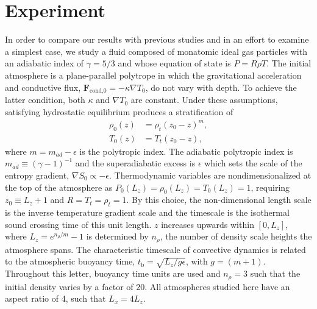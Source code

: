 \documentclass[aps, prl, twocolumn, nofootinbib, groupedaddress, amsfonts, amssymb, amsmath]{revtex4-1}
\newcommand{\grad}{\ensuremath{\nabla}}
\begin{document}
\section{Experiment} 
\label{sec:experiment}
In order to compare our results with previous studies and in an effort to examine a simplest case,
we study a fluid composed of monatomic ideal gas particles with an adiabatic index of $\gamma = 5/3$ and
whose equation of state is $P = R\rho T$. 
The initial atmosphere is a plane-parallel polytrope in which the gravitational acceleration
and conductive flux, $\bm{F}_{\text{cond,0}} = -\kappa \grad T_0$, do not vary with depth. To
achieve the latter condition, both $\kappa$ and $\grad T_0$ are constant.
Under these assumptions, satisfying hydrostatic equilibrium produces a stratification of
\begin{equation}
\begin{split}
\rho_0(z) &= \rho_{t}(z_0 - z)^m, \\
T_0(z)    &= T_{t}(z_0 - z),
\label{eqn:polytrope}
\end{split}
\end{equation}
where $m = m_{ad} - \epsilon$ is the polytropic index.
The adiabatic polytropic index is $m_{ad} \equiv (\gamma-1)^{-1}$ and
the superadiabatic excess is $\epsilon$ which sets the scale 
of the entropy gradient, $\grad S_0 \propto -\epsilon$.
Thermodynamic variables are nondimensionalized at the top of the atmosphere as 
$P_0(L_z) = \rho_0(L_z) = T_0(L_z) = 1$, requiring $z_0 \equiv L_z + 1$ and $R = T_{t} = \rho_{t} = 1$.
By this choice, the non-dimensional length scale is the inverse temperature gradient scale and
the timescale is the isothermal sound crossing time of this unit length.
$z$ increases upwards within $[0, L_{z}]$, where $L_{z} = e^{n_{\rho}/m} - 1$ is
determined by $n_\rho$, the number of density scale heights the atmosphere spans.
The characteristic timescale of convective dynamics
is related to the atmospheric buoyancy time, $t_{\text{b}} = \sqrt{L_z/g\epsilon}$, with $g = (m+1)$.
Throughout this letter, buoyancy time units are used and 
$n_{\rho} = 3$ such that the initial density varies by a factor of 20.
All atmospheres studied here have an aspect ratio of 4, such that $L_x = 4L_z$.
\end{document}

